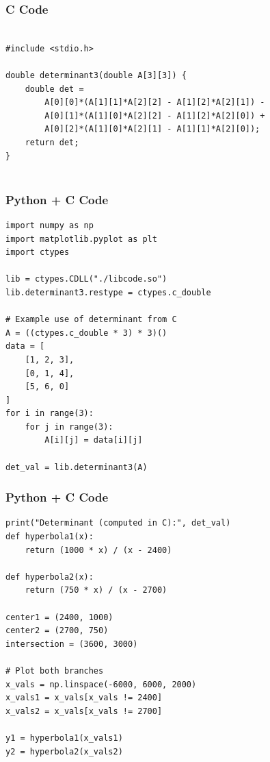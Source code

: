 \documentclass{beamer}
\begin{document}
\begin{frame}[fragile]
    \frametitle{C Code}
    \begin{lstlisting}

#include <stdio.h>

double determinant3(double A[3][3]) {
    double det =
        A[0][0]*(A[1][1]*A[2][2] - A[1][2]*A[2][1]) -
        A[0][1]*(A[1][0]*A[2][2] - A[1][2]*A[2][0]) +
        A[0][2]*(A[1][0]*A[2][1] - A[1][1]*A[2][0]);
    return det;
}


    \end{lstlisting}
\end{frame}
\begin{frame}[fragile]
    \frametitle{Python + C Code}
    \begin{lstlisting}
import numpy as np
import matplotlib.pyplot as plt
import ctypes

lib = ctypes.CDLL("./libcode.so")
lib.determinant3.restype = ctypes.c_double

# Example use of determinant from C
A = ((ctypes.c_double * 3) * 3)()
data = [
    [1, 2, 3],
    [0, 1, 4],
    [5, 6, 0]
]
for i in range(3):
    for j in range(3):
        A[i][j] = data[i][j]

det_val = lib.determinant3(A)
    \end{lstlisting}
\end{frame}
\begin{frame}[fragile]
    \frametitle{Python + C Code}
    \begin{lstlisting}
print("Determinant (computed in C):", det_val)
def hyperbola1(x):
    return (1000 * x) / (x - 2400)

def hyperbola2(x):
    return (750 * x) / (x - 2700)

center1 = (2400, 1000)
center2 = (2700, 750)
intersection = (3600, 3000)

# Plot both branches
x_vals = np.linspace(-6000, 6000, 2000)
x_vals1 = x_vals[x_vals != 2400]
x_vals2 = x_vals[x_vals != 2700]

y1 = hyperbola1(x_vals1)
y2 = hyperbola2(x_vals2)


    \end{lstlisting}
\end{frame}
\end{document}
